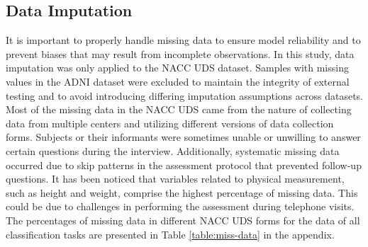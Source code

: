 \subsection{Data Imputation}
It is important to properly handle missing data to ensure model reliability and to prevent biases that may result from incomplete observations. In this study, data imputation was only applied to the NACC UDS dataset. Samples with missing values in the ADNI dataset were excluded to maintain the integrity of external testing and to avoid introducing differing imputation assumptions across datasets. Most of the missing data in the NACC UDS came from the nature of collecting data from multiple centers and utilizing different versions of data collection forms. Subjects or their informants were sometimes unable or unwilling to answer certain questions during the interview. Additionally, systematic missing data occurred due to skip patterns in the assessment protocol that prevented follow-up questions. It has been noticed that variables related to physical measurement, such as height and weight, comprise the highest percentage of missing data. This could be due to challenges in performing the assessment during telephone visits. The percentages of missing data in different NACC UDS forms for the data of all classification tasks are presented in Table \ref{table:miss-data} in the appendix.

